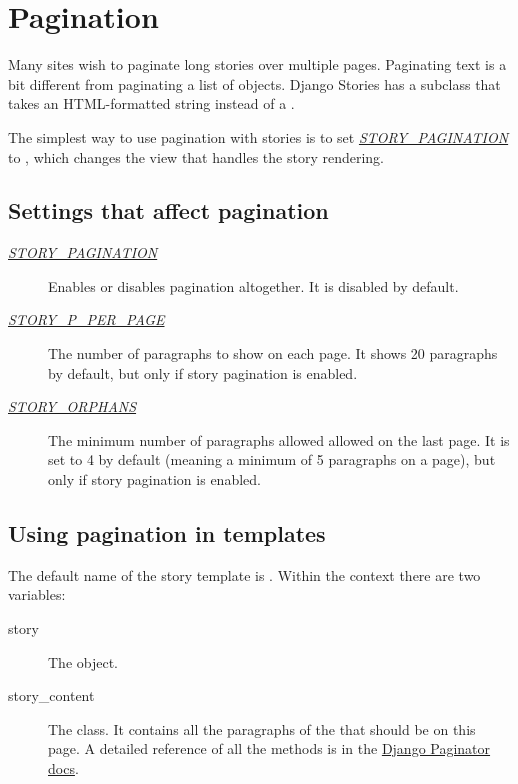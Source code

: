 \documentclass[letterpaper,10pt,english]{manual}
\begin{document}
\resetcurrentobjects
\hypertarget{--doc-pagination}{}

\hypertarget{pagination}{}\chapter{Pagination}

Many sites wish to paginate long stories over multiple pages. Paginating text is a bit different from paginating a list of objects. Django Stories has a  subclass that takes an HTML-formatted string instead of a .

The simplest way to use pagination with stories is to set \hyperlink{story-pagination}{\emph{STORY\_PAGINATION}} to , which changes the view that handles the story rendering.


\section{Settings that affect pagination}
\begin{description}
\item[\hyperlink{story-pagination}{\emph{STORY\_PAGINATION}}] \leavevmode
Enables or disables pagination altogether. It is disabled by default.

\item[\hyperlink{story-p-per-page}{\emph{STORY\_P\_PER\_PAGE}}] \leavevmode
The number of paragraphs to show on each page. It shows 20 paragraphs by default, but only if story pagination is enabled.

\item[\hyperlink{story-orphans}{\emph{STORY\_ORPHANS}}] \leavevmode
The minimum number of paragraphs allowed allowed on the last page. It is set to 4 by default (meaning a minimum of 5 paragraphs on a page), but only if story pagination is enabled.

\end{description}


\section{Using pagination in templates}

The default name of the story template is . Within the context there are two variables:
\begin{description}
\item[story] \leavevmode
The  object.

\item[story\_content] \leavevmode
The  class. It contains all the paragraphs of the  that should be on this page. A detailed reference of all the methods is in the \href{http://docs.djangoproject.com/en/dev/topics/pagination/\#paginator-objects}{Django Paginator docs}.

\end{description}
\end{document}
